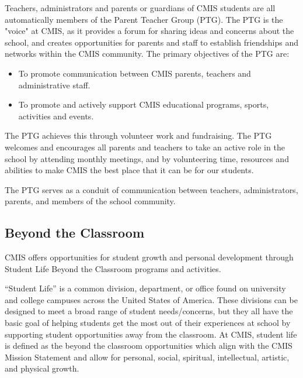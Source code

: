 
Teachers, administrators and parents or guardians of CMIS students are all automatically members of the Parent Teacher Group (PTG). The PTG is the "voice" at CMIS, as it provides a forum for sharing ideas and concerns about the school, and creates opportunities for parents and staff to establish friendships and networks within the CMIS community. The primary objectives of the PTG are:

\begin{itemize}
\item To promote communication between CMIS parents, teachers and administrative staff.
\item To promote and actively support CMIS educational programs, sports, activities and events.
\end{itemize}
 
The PTG achieves this through volunteer work and fundraising.  The PTG welcomes and encourages all parents and teachers to take an active role in the school by attending monthly meetings, and by volunteering time, resources and abilities to make CMIS the best place that it can be for our students.

The PTG serves as a conduit of communication between teachers, administrators, parents, and members of the school community.  


\subsection{Beyond the Classroom}

CMIS offers opportunities for student growth and personal development through Student Life Beyond the Classroom programs and activities.  


“Student Life” is a common division, department, or office found on university and college campuses across the United States of America.  These divisions can be designed to meet a broad range of student needs/concerns, but they all have the basic goal of helping students get the most out of their experiences at school by supporting student opportunities away from the classroom.  At CMIS, student life is defined as the beyond the classroom opportunities which align with the CMIS Mission Statement and allow for personal, social, spiritual, intellectual, artistic, and physical growth.

